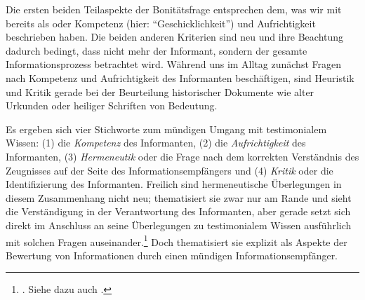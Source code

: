 Die ersten beiden Teilaspekte der Bonitätsfrage entsprechen dem, was
wir mit  bereits als
 oder Kompetenz (hier: \enquote{Geschicklichkeit}) und
Aufrichtigkeit beschrieben haben. Die beiden anderen Kriterien sind neu und ihre Beachtung
dadurch bedingt, dass nicht mehr der Informant, sondern der gesamte
Informationsprozess betrachtet wird. Während uns im Alltag zunächst Fragen nach
Kompetenz und Aufrichtigkeit des Informanten beschäftigen, sind Heuristik und
Kritik gerade bei der Beurteilung historischer Dokumente wie alter Urkunden oder
heiliger Schriften von Bedeutung.


Es ergeben sich vier Stichworte zum mündigen Umgang mit testimonialem Wissen:
(1) die \emph{Kompetenz} des Informanten, (2) die \emph{Aufrichtigkeit} des
Informanten, (3) \emph{Hermeneutik} oder die Frage nach dem korrekten
Verständnis des Zeugnisses auf der Seite des Informationsempfängers und (4)
\emph{Kritik} oder die Identifizierung des Informanten.
Freilich sind hermeneutische Überlegungen in diesem Zusammenhang nicht neu;
 thematisiert sie zwar nur am Rande
und sieht die Verständigung in der Verantwortung des Informanten, aber gerade
 setzt sich direkt im
Anschluss an seine Überlegungen zu testimonialem Wissen ausführlich mit solchen
Fragen auseinander.\footnote{\cite[Vgl.][\S\S~628--656]{Crusius:WegzurGewissheitundZuverlaessigkeitdermenschlichenErkenntniss1965}.
Siehe dazu auch \cite[][44--51]{Scholz:VerstehenundRationalitaet1999}.} Doch
thematisiert sie explizit als Aspekte der Bewertung von Informationen durch
einen mündigen Informationsempfänger.


